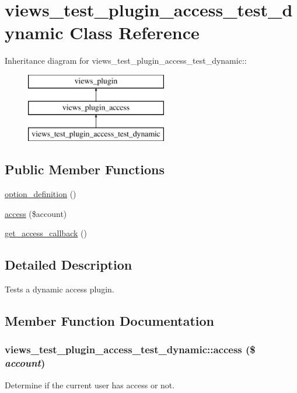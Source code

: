 \hypertarget{classviews__test__plugin__access__test__dynamic}{
\section{views\_\-test\_\-plugin\_\-access\_\-test\_\-dynamic Class Reference}
\label{classviews__test__plugin__access__test__dynamic}
}
Inheritance diagram for views\_\-test\_\-plugin\_\-access\_\-test\_\-dynamic::\begin{figure}[H]
\begin{center}
\leavevmode
\includegraphics[height=3cm]{classviews__test__plugin__access__test__dynamic}
\end{center}
\end{figure}
\subsection*{Public Member Functions}
\begin{DoxyCompactItemize}
\item 
\hyperlink{classviews__test__plugin__access__test__dynamic_a93811dcacbb91508644cf989d53ca5cb}{option\_\-definition} ()
\item 
\hyperlink{classviews__test__plugin__access__test__dynamic_a44a0d68fea7b88011bd5bea488ae982f}{access} (\$account)
\item 
\hyperlink{classviews__test__plugin__access__test__dynamic_ac4efa2ff862eb1592afd64b76ebfed1d}{get\_\-access\_\-callback} ()
\end{DoxyCompactItemize}


\subsection{Detailed Description}
Tests a dynamic access plugin. 

\subsection{Member Function Documentation}
\hypertarget{classviews__test__plugin__access__test__dynamic_a44a0d68fea7b88011bd5bea488ae982f}{
\subsubsection[{access}]{\setlength{\rightskip}{0pt plus 5cm}views\_\-test\_\-plugin\_\-access\_\-test\_\-dynamic::access (\$ {\em account})}}
\label{classviews__test__plugin__access__test__dynamic_a44a0d68fea7b88011bd5bea488ae982f}
Determine if the current user has access or not. 

